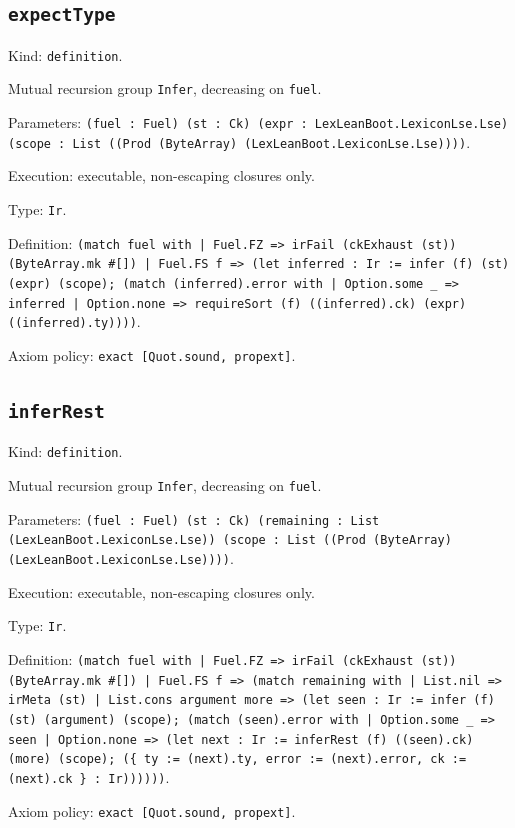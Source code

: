 \documentclass[11pt]{article}
\begin{document}
\subsection*{\texttt{expectType}}
\noindent Kind: \texttt{definition}.\par
\noindent Mutual recursion group \texttt{Infer}, decreasing on \texttt{fuel}.\par
\noindent Parameters: \texttt{(fuel : Fuel) (st : Ck) (expr : LexLeanBoot.LexiconLse.Lse) (scope : List ((Prod (ByteArray) (LexLeanBoot.LexiconLse.Lse))))}.\par
\noindent Execution: executable, non-escaping closures only.\par
\noindent Type: \texttt{Ir}.\par
\noindent Definition: \texttt{(match fuel with | Fuel.FZ => irFail (ckExhaust (st)) (ByteArray.mk \#[]) | Fuel.FS f => (let inferred : Ir := infer (f) (st) (expr) (scope); (match (inferred).error with | Option.some \_ => inferred | Option.none => requireSort (f) ((inferred).ck) (expr) ((inferred).ty))))}.\par
\noindent Axiom policy: \texttt{exact [Quot.sound, propext]}.\par
\subsection*{\texttt{inferRest}}
\noindent Kind: \texttt{definition}.\par
\noindent Mutual recursion group \texttt{Infer}, decreasing on \texttt{fuel}.\par
\noindent Parameters: \texttt{(fuel : Fuel) (st : Ck) (remaining : List (LexLeanBoot.LexiconLse.Lse)) (scope : List ((Prod (ByteArray) (LexLeanBoot.LexiconLse.Lse))))}.\par
\noindent Execution: executable, non-escaping closures only.\par
\noindent Type: \texttt{Ir}.\par
\noindent Definition: \texttt{(match fuel with | Fuel.FZ => irFail (ckExhaust (st)) (ByteArray.mk \#[]) | Fuel.FS f => (match remaining with | List.nil => irMeta (st) | List.cons argument more => (let seen : Ir := infer (f) (st) (argument) (scope); (match (seen).error with | Option.some \_ => seen | Option.none => (let next : Ir := inferRest (f) ((seen).ck) (more) (scope); (\{ ty := (next).ty, error := (next).error, ck := (next).ck \} : Ir))))))}.\par
\noindent Axiom policy: \texttt{exact [Quot.sound, propext]}.\par
\end{document}
